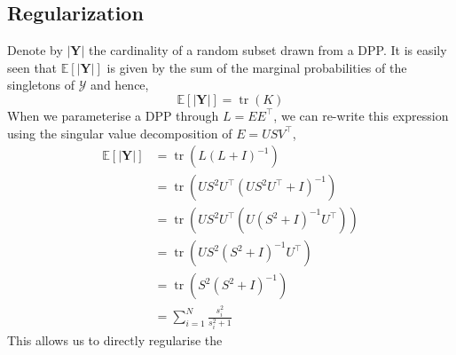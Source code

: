 \documentclass[12pt, oneside]{article}   	%
\DeclareMathOperator{\tr}{tr}
\begin{document}
\subsection*{Regularization}
Denote by $|\textbf{Y}|$ the cardinality of a random subset drawn from a DPP. It is easily seen that $\mathbb{E}[|\textbf{Y}|]$ is given by the sum of the marginal probabilities of the singletons of $\mathcal{Y}$ and hence, 
\begin{equation}
\mathbb{E}[|\textbf{Y}|] = \tr(K)
\end{equation}
When we parameterise a DPP through $L = EE^{\top}$, we can re-write this expression using the singular value decomposition of $E = USV^{\top}$, 
\begin{align*}
  \mathbb{E}[|\textbf{Y}|] 
  &= \tr(L(L+I)^{-1})
  \\ &= \tr(US^{2}U^{\top}(US^{2}U^{\top}+I)^{-1})
  \\ &= \tr(US^{2}U^{\top}(U(S^{2} + I)^{-1}U^{\top}))
  \\ &= \tr(US^{2}(S^{2} + I)^{-1}U^{\top})
  \\ &= \tr(S^{2}(S^{2} + I)^{-1})
  \\ &= \sum_{i = 1}^{N}\frac{s_{i}^{2}}{s_{i}^{2} + 1}
  \end{align*}
This allows us to directly regularise the 




{}

\end{document}

